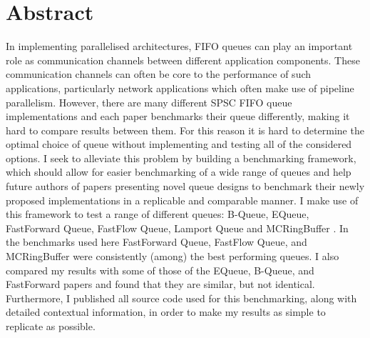 \section*{Abstract}
In implementing parallelised architectures, FIFO queues can play an important role as communication channels
between different application components\cite{WangCheng2009}.
These communication channels can often be core to the performance of such applications, particularly network
applications which often make use of pipeline parallelism\cite{Upadhyaya2007,WangCheng2009}.
However, there are many different SPSC FIFO queue implementations and each paper benchmarks their queue
differently, making it hard to compare results between them.
For this reason it is hard to determine the optimal choice of queue without implementing and testing all of the
considered options.
I seek to alleviate this problem by building a benchmarking framework, which should allow for easier
benchmarking of a wide range of queues and help future authors of papers presenting novel queue designs to
benchmark their newly proposed implementations in a replicable and comparable manner.
I make use of this framework to test a range of different queues: B-Queue, EQueue, FastForward Queue,
FastFlow Queue, Lamport Queue and MCRingBuffer \cite{B-Queue,EQueue,FastForward,FastFlowGithub,Lamport,MCRingBuffer}.
In the benchmarks used here FastForward Queue, FastFlow Queue, and MCRingBuffer were consistently (among) the
best performing queues.
I also compared my results with some of those of the EQueue, B-Queue, and FastForward papers and found that
they are similar, but not identical.
Furthermore, I published all source code used for this benchmarking, along with detailed contextual information,
in order to make my results as simple to replicate as possible.
